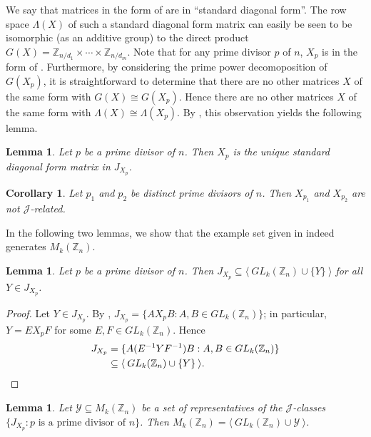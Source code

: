 \documentclass[11pt]{article}
\newtheorem{cor}[thm]{Corollary}
\newtheorem{lemma}[thm]{Lemma}
\numberwithin{equation}{section}
\newcommand{\set}[2]{\ensuremath{\{#1 : #2 \}}}
\newcommand{\genset}[1]{\ensuremath{\langle\: #1 \:\rangle}}
\newcommand{\J}{\mathscr{J}}
\newcommand{\Z}{\mathbb{Z}}
\newcommand{\RowS}{\Lambda}
\begin{document}
We say that matrices in the form of  are in ``standard diagonal
form''.  The row space $\RowS(X)$ of such a standard diagonal form matrix can
easily be seen to be isomorphic (as an additive group) to the direct product
$G(X) = \Z_{n/d_1} \times \cdots \times \Z_{n/d_m}$. Note that for any prime
divisor $p$ of $n$, $X_p$ is in the form of . Furthermore, by
considering the prime power decomoposition of $G(X_p)$, it is straightforward to
determine that there are no other matrices $X$ of the same form with $G(X) \cong
G(X_p)$. Hence there are no other matrices $X$ of the same form with $\RowS(X)
\cong \RowS(X_p)$. By , this observation yields
the following lemma. 

\begin{lemma}
  Let $p$ be a prime divisor of $n$. Then $X_p$ is the unique standard diagonal
  form matrix in $J_{X_p}$.
\end{lemma}

\begin{cor}
  Let $p_1$ and $p_2$ be distinct prime divisors of $n$. Then $X_{p_1}$
  and $X_{p_2}$ are not $\J$-related.
\end{cor}

In the following two lemmas, we show that the example set
given in  indeed generates $M_k(\Z_n)$.

\begin{lemma}
  Let $p$ be a prime divisor of $n$.
  Then $J_{X_p} \subseteq \genset{GL_k(\Z_n) \cup \{Y\}}$ for all $Y \in
  J_{X_p}$.
\end{lemma}

\begin{proof}
    Let $Y \in J_{X_{p}}$.
    By ,
    $J_{X_{p}} = \set{AX_{p}B}{A,B \in GL_k(\Z_n)}$;
    in particular, $Y = EX_{p}F$ for some $E,F \in
    GL_k(\Z_n)$. Hence 
    \begin{align*}
      J_{X_p} &= \set{A(E^{-1}YF^{-1})B}{A,B \in GL_k(\Z_n)} \\
              &\subseteq \genset{GL_k(\Z_n) \cup \{Y\}}. \qedhere
    \end{align*}
\end{proof}

\begin{lemma}
  Let $\mathcal{Y} \subseteq M_k(\Z_n)$ be a set of representatives of the
  \(\J\)-classes \(\set{J_{X_{p}}}{p \text{ is a prime divisor of } n }\).
  Then $M_k(\Z_n) = \genset{GL_k(\Z_n) \cup \mathcal{Y}}$.
\end{lemma}
\end{document}

